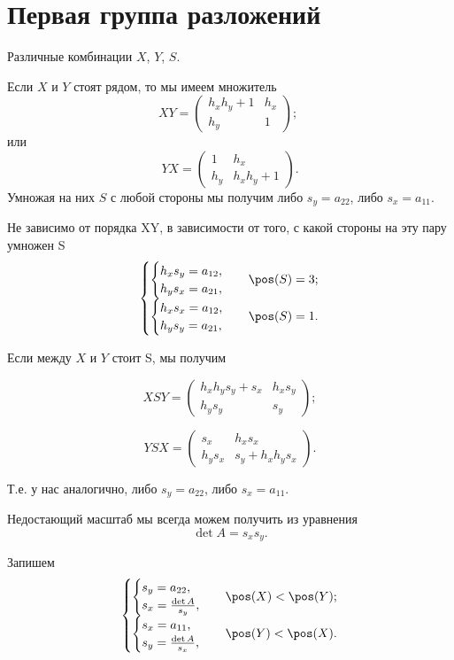 \section{Первая группа разложений}

Различные комбинации $X$, $Y$, $S$.

Если $X$ и $Y$ стоят рядом, то мы имеем множитель
$$XY = \begin{pmatrix}
	h_xh_y+1 & h_x \\
	h_y & 1
\end{pmatrix};\;
$$
или
$$
YX = \begin{pmatrix}
	1 & h_x \\
	h_y & h_xh_y+1
\end{pmatrix}.$$
Умножая на них $S$ с любой стороны мы получим либо $s_y = a_{22}$, либо $s_x = a_{11}$.

Не зависимо от порядка XY, в зависимости от того, с какой стороны на эту пару умножен S
$$\begin{cases}
	\begin{cases}
		h_xs_y = a_{12},\\
		h_ys_x = a_{21},
	\end{cases}
	& \pos(S)=3;\\
	\begin{cases}
		h_xs_x = a_{12},\\
		h_ys_y = a_{21},
	\end{cases}
	& \pos(S)=1.
\end{cases}
$$


Если между $X$ и $Y$ стоит S, мы получим

$$XSY =
\begin{pmatrix}
	h_x h_y s_y + s_x & h_x s_y \\
	h_y s_y  & s_y
\end{pmatrix};
$$

$$YSX =
\begin{pmatrix}
s_x & h_x s_x\\
h_y s_x & s_y + h_x h_y s_x
\end{pmatrix}.
$$

Т.е. у нас аналогично, либо $s_y = a_{22}$, либо $s_x = a_{11}$.

Недостающий масштаб мы всегда можем получить из уравнения
$$\det A = s_x s_y.$$

Запишем
$$\begin{cases}
	\begin{cases}
		s_y = a_{22},\\
		s_x = \frac{\det{A}}{s_y},\\
	\end{cases} & \pos(X)<\pos(Y);\\
	\begin{cases}
		s_x = a_{11},\\
		s_y = \frac{\det{A}}{s_x},\\
	\end{cases} & \pos(Y)<\pos(X).
\end{cases}$$


